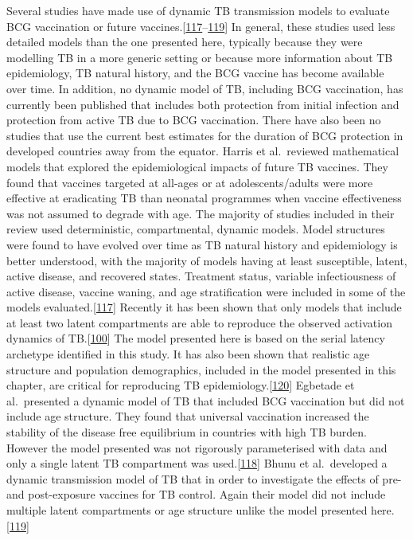 \documentclass[11pt,twoside]{bristolthesis}
\begin{document}
  Several studies have made use of dynamic TB transmission models to evaluate BCG vaccination or future vaccines.{[}\protect\hyperlink{ref-Harris2016}{117}--\protect\hyperlink{ref-Bhunu2008b}{119}{]} In general, these studies used less detailed models than the one presented here, typically because they were modelling TB in a more generic setting or because more information about TB epidemiology, TB natural history, and the BCG vaccine has become available over time. In addition, no dynamic model of TB, including BCG vaccination, has currently been published that includes both protection from initial infection and protection from active TB due to BCG vaccination. There have also been no studies that use the current best estimates for the duration of BCG protection in developed countries away from the equator. Harris et al.~reviewed mathematical models that explored the epidemiological impacts of future TB vaccines. They found that vaccines targeted at all-ages or at adolescents/adults were more effective at eradicating TB than neonatal programmes when vaccine effectiveness was not assumed to degrade with age. The majority of studies included in their review used deterministic, compartmental, dynamic models. Model structures were found to have evolved over time as TB natural history and epidemiology is better understood, with the majority of models having at least susceptible, latent, active disease, and recovered states. Treatment status, variable infectiousness of active disease, vaccine waning, and age stratification were included in some of the models evaluated.{[}\protect\hyperlink{ref-Harris2016}{117}{]} Recently it has been shown that only models that include at least two latent compartments are able to reproduce the observed activation dynamics of TB.{[}\protect\hyperlink{ref-Ragonnet2017}{100}{]} The model presented here is based on the serial latency archetype identified in this study. It has also been shown that realistic age structure and population demographics, included in the model presented in this chapter, are critical for reproducing TB epidemiology.{[}\protect\hyperlink{ref-Brooks-Pollock2010}{120}{]} Egbetade et al.~presented a dynamic model of TB that included BCG vaccination but did not include age structure. They found that universal vaccination increased the stability of the disease free equilibrium in countries with high TB burden. However the model presented was not rigorously parameterised with data and only a single latent TB compartment was used.{[}\protect\hyperlink{ref-Egbetade2011a}{118}{]} Bhunu et al.~developed a dynamic transmission model of TB that in order to investigate the effects of pre- and post-exposure vaccines for TB control. Again their model did not include multiple latent compartments or age structure unlike the model presented here.{[}\protect\hyperlink{ref-Bhunu2008b}{119}{]}
  
\end{document}
